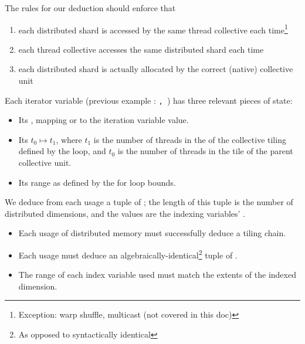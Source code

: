 \filbreak
The rules for our deduction should enforce that
\begin{enumerate}
  \item each distributed shard is accessed by the same thread collective each time\footnote{Exception: warp shuffle, multicast (not covered in this doc)}
  \filbreak
  \item each thread collective accesses the same distributed shard each time
  \filbreak
  \item each distributed shard is actually allocated by the correct (native) collective unit
\end{enumerate}

\filbreak
{}

Each  iterator variable (previous example : \texttt{, }) has three relevant pieces of state:
\begin{itemize}
  \item Its , mapping  or  to the iteration variable value.
  \filbreak
  \item Its  $t_0 \mapsto t_1$, where $t_1$ is the number of threads in the  of the collective tiling defined by the  loop, and $t_0$ is the number of threads in the tile of the parent collective unit.
  \filbreak
  \item Its range \lighttt{[0, hi)} as defined by the for loop bounds.
\end{itemize}

\filbreak
We deduce from each usage a tuple of ; the length of this tuple is the number of distributed dimensions, and the values are the indexing variables' .



\filbreak
{}
\begin{itemize}
  \item Each usage of distributed memory must successfully deduce a tiling chain.
  \filbreak
  \item Each usage must deduce an algebraically-identical\footnote{As opposed to syntactically identical} tuple of .
  \filbreak
  \item The range of each index variable used must match the extents of the indexed dimension.
\end{itemize}

